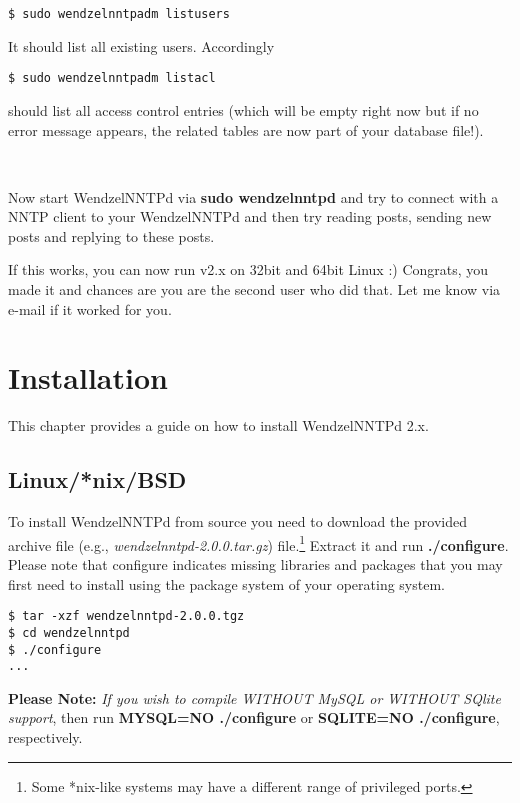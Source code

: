 \documentclass[12pt,fleqn,leqno]{scrbook}
\begin{document}
\begin{verbatim}
$ sudo wendzelnntpadm listusers
\end{verbatim}

It should list all existing users. Accordingly

\begin{verbatim}
$ sudo wendzelnntpadm listacl
\end{verbatim}

should list all access control entries (which will be empty right now
but if no error message appears, the related tables are now part of your
database file!).

~

Now start WendzelNNTPd via \textbf{sudo wendzelnntpd} and try to connect
with a NNTP client to your WendzelNNTPd and then try reading posts,
sending new posts and replying to these posts.

If this works, you can now run v2.x on 32bit and 64bit Linux :)
Congrats, you made it and chances are you are the second user who did
that. Let me know via e-mail if it worked for you.

\hypertarget{installation-1}{%
\section{Installation}\label{installation-1}}

This chapter provides a guide on how to install WendzelNNTPd 2.x.

\hypertarget{linuxnixbsd-1}{%
\subsection{Linux/*nix/BSD}\label{linuxnixbsd-1}}

To install WendzelNNTPd from source you need to download the provided
archive file (e.g., \emph{wendzelnntpd-2.0.0.tar.gz}) file.\footnote{Some
  *nix-like systems may have a different range of privileged ports.}
Extract it and run \textbf{./configure}. Please note that configure
indicates missing libraries and packages that you may first need to
install using the package system of your operating system.

\begin{verbatim}
$ tar -xzf wendzelnntpd-2.0.0.tgz
$ cd wendzelnntpd
$ ./configure
...
\end{verbatim}

\textbf{Please Note:} \emph{If you wish to compile WITHOUT MySQL or
WITHOUT SQlite support}, then run \textbf{MYSQL=NO ./configure} or
\textbf{SQLITE=NO ./configure}, respectively.
\end{document}
